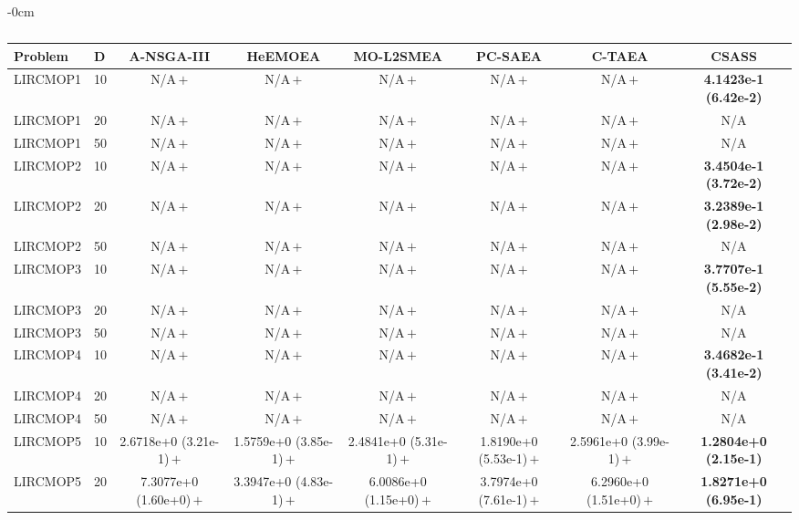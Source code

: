 \begin{table}[!htbp]
\begin{ROneBlock}
\begin{adjustwidth}{-\extralength}{0cm}
\centering
\scriptsize
\setlength{\tabcolsep}{3pt}
\renewcommand{\arraystretch}{1.12}
\caption{}\label{tab:lircmop-igd}
\begin{tabular*}{\linewidth}{@{\extracolsep{\fill}}llcccccc@{}}
\toprule
Problem & D & A-NSGA-III & HeEMOEA & MO-L2SMEA & PC-SAEA & C-TAEA & CSASS \\
\midrule
LIRCMOP1 & 10 & N/A\,$+$ & N/A\,$+$ & N/A\,$+$ & N/A\,$+$ & N/A\,$+$ & \textbf{4.1423e-1 (6.42e-2)} \\
LIRCMOP1 & 20 & N/A\,$+$ & N/A\,$+$ & N/A\,$+$ & N/A\,$+$ & N/A\,$+$ & N/A \\
LIRCMOP1 & 50 & N/A\,$+$ & N/A\,$+$ & N/A\,$+$ & N/A\,$+$ & N/A\,$+$ & N/A \\
LIRCMOP2 & 10 & N/A\,$+$ & N/A\,$+$ & N/A\,$+$ & N/A\,$+$ & N/A\,$+$ & \textbf{3.4504e-1 (3.72e-2)} \\
LIRCMOP2 & 20 & N/A\,$+$ & N/A\,$+$ & N/A\,$+$ & N/A\,$+$ & N/A\,$+$ & \textbf{3.2389e-1 (2.98e-2)} \\
LIRCMOP2 & 50 & N/A\,$+$ & N/A\,$+$ & N/A\,$+$ & N/A\,$+$ & N/A\,$+$ & N/A \\
LIRCMOP3 & 10 & N/A\,$+$ & N/A\,$+$ & N/A\,$+$ & N/A\,$+$ & N/A\,$+$ & \textbf{3.7707e-1 (5.55e-2)} \\
LIRCMOP3 & 20 & N/A\,$+$ & N/A\,$+$ & N/A\,$+$ & N/A\,$+$ & N/A\,$+$ & N/A \\
LIRCMOP3 & 50 & N/A\,$+$ & N/A\,$+$ & N/A\,$+$ & N/A\,$+$ & N/A\,$+$ & N/A \\
LIRCMOP4 & 10 & N/A\,$+$ & N/A\,$+$ & N/A\,$+$ & N/A\,$+$ & N/A\,$+$ & \textbf{3.4682e-1 (3.41e-2)} \\
LIRCMOP4 & 20 & N/A\,$+$ & N/A\,$+$ & N/A\,$+$ & N/A\,$+$ & N/A\,$+$ & N/A \\
LIRCMOP4 & 50 & N/A\,$+$ & N/A\,$+$ & N/A\,$+$ & N/A\,$+$ & N/A\,$+$ & N/A \\
LIRCMOP5 & 10 & 2.6718e+0 (3.21e-1)\,$+$ & 1.5759e+0 (3.85e-1)\,$+$ & 2.4841e+0 (5.31e-1)\,$+$ & 1.8190e+0 (5.53e-1)\,$+$ & 2.5961e+0 (3.99e-1)\,$+$ & \textbf{1.2804e+0 (2.15e-1)} \\
LIRCMOP5 & 20 & 7.3077e+0 (1.60e+0)\,$+$ & 3.3947e+0 (4.83e-1)\,$+$ & 6.0086e+0 (1.15e+0)\,$+$ & 3.7974e+0 (7.61e-1)\,$+$ & 6.2960e+0 (1.51e+0)\,$+$ & \textbf{1.8271e+0 (6.95e-1)} \\

\end{tabular*}
\end{adjustwidth}
\end{ROneBlock}
\end{table}
